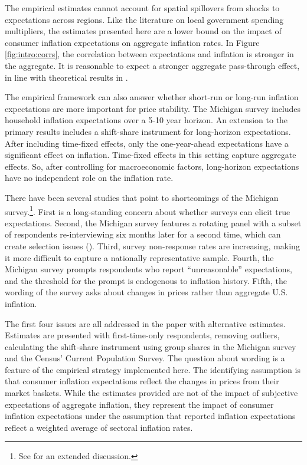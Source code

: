 \documentclass[12pt]{article}
\begin{document}
The empirical estimates cannot account for spatial spillovers from shocks to expectations across regions. Like the literature on local government spending multipliers, the estimates presented here are a lower bound on the impact of consumer inflation expectations on aggregate inflation rates. In Figure \ref{fig:intro:corrs}, the correlation between expectations and inflation is stronger in the aggregate. It is reasonable to expect a stronger aggregate pass-through effect, in line with theoretical results in \cite{Werning:expectsWP}.

The empirical framework can also answer whether short-run or long-run inflation expectations are more important for price stability. The Michigan survey includes household inflation expectations over a 5-10 year horizon. An extension to the primary results includes a shift-share instrument for long-horizon expectations. After including time-fixed effects, only the one-year-ahead expectations have a significant effect on inflation. Time-fixed effects in this setting capture aggregate effects. So, after controlling for macroeconomic factors, long-horizon expectations have no independent role on the inflation rate.

There have been several studies that point to shortcomings of the Michigan survey.\footnote{See \cite{JELexpects} for an extended discussion.}. First is a long-standing concern about whether surveys can elicit true expectations. Second, the Michigan survey features a rotating panel with a subset of respondents re-interviewing six months later for a second time, which can create selection issues (\cite{BinderKim:AEJM2021}). Third, survey non-response rates are increasing, making it more difficult to capture a nationally representative sample. Fourth, the Michigan survey prompts respondents who report ``unreasonable'' expectations, and the threshold for the prompt is endogenous to inflation history. Fifth, the wording of the survey asks about changes in prices rather than aggregate U.S. inflation.

The first four issues are all addressed in the paper with alternative estimates. Estimates are presented with first-time-only respondents, removing outliers, calculating the shift-share instrument using group shares in the Michigan survey and the Census' Current Population Survey. The question about wording is a feature of the empirical strategy implemented here. The identifying assumption is that consumer inflation expectations reflect the changes in prices from their market baskets. While the estimates provided are not of the impact of subjective expectations of aggregate inflation, they represent the impact of consumer inflation expectations under the assumption that reported inflation expectations reflect a weighted average of sectoral inflation rates.
\end{document}

